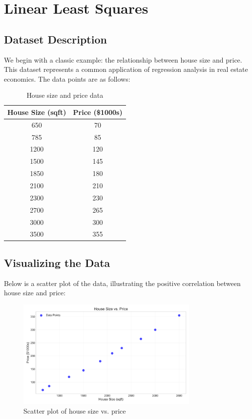 \documentclass[12pt]{article}
\begin{document}
\section{Linear Least Squares}

\subsection{Dataset Description}

We begin with a classic example: the relationship between house size and price. This dataset represents a common application of regression analysis in real estate economics. The data points are as follows:

\begin{table}[H]
\centering
\begin{tabular}{cc}
\toprule
House Size (sqft) & Price (\$1000s) \\
\midrule
650 & 70 \\
785 & 85 \\
1200 & 120 \\
1500 & 145 \\
1850 & 180 \\
2100 & 210 \\
2300 & 230 \\
2700 & 265 \\
3000 & 300 \\
3500 & 355 \\
\bottomrule
\end{tabular}
\caption{House size and price data}
\label{tab:house_data}
\end{table}

\subsection{Visualizing the Data}

Below is a scatter plot of the data, illustrating the positive correlation between house size and price:

\begin{figure}[H]
\centering
\includegraphics[width=0.8\textwidth]{scatter_plot.png}
\caption{Scatter plot of house size vs. price}
\label{fig:scatter_plot}
\end{figure}
\end{document}
